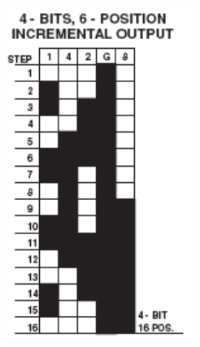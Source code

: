 \documentclass[10pt]{article}
\begin{document}
\begin{minipage}[c]{.28\linewidth}

\begin{center}
\includegraphics[width=.9\textwidth]{images/codeur_table}
\end{center}
\end{minipage} 
\end{document}
